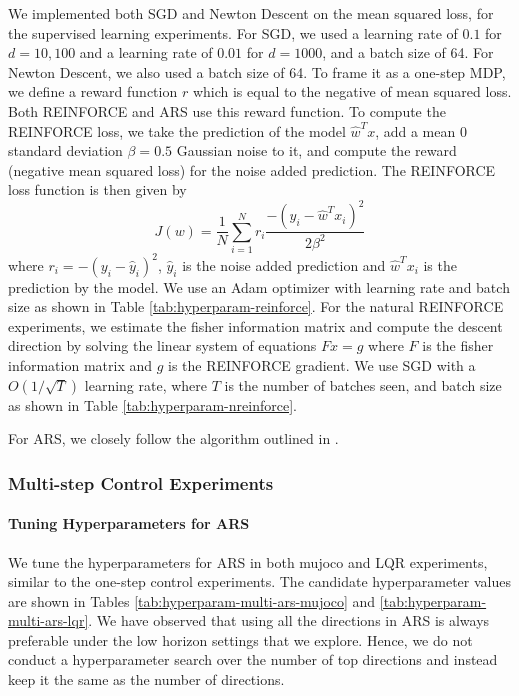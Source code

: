 We implemented both SGD and Newton Descent on the mean squared loss, for the supervised learning experiments. For SGD, we used a learning rate of $0.1$ for $d=10, 100$ and a learning rate of $0.01$ for $d=1000$, and a batch size of 64. For Newton Descent, we also used a batch size of 64. To frame it as a one-step MDP, we define a reward function $r$ which is equal to the negative of mean squared loss. Both REINFORCE and ARS use this reward function. To compute the REINFORCE loss, we take the prediction of the model $\hat{w}^Tx$, add a mean $0$ standard deviation $\beta = 0.5$ Gaussian noise to it, and compute the reward (negative mean squared loss) for the noise added prediction. The REINFORCE loss function is then given by
\begin{equation}
    J(w) = \frac{1}{N} \sum_{i=1}^N r_i \frac{- (y_i - \hat{w}^Tx_i)^2}{2\beta^2}
\end{equation}
where $r_i = -(y_i - \hat y_i)^2$, $\hat y_i$ is the noise added prediction and $\hat{w}^Tx_i$ is the prediction by the model. We use an Adam optimizer with learning rate and batch size as shown in Table \ref{tab:hyperparam-reinforce}. For the natural REINFORCE experiments, we estimate the fisher information matrix and compute the descent direction by solving the linear system of equations $Fx = g$ where $F$ is the fisher information matrix and $g$ is the REINFORCE gradient. We use SGD with a $O(1/\sqrt{T})$ learning rate, where $T$ is the number of batches seen, and batch size as shown in Table \ref{tab:hyperparam-nreinforce}.

For ARS, we closely follow the algorithm outlined in \citep{mania2018simple}.

\subsubsection{Multi-step Control Experiments}
\label{sec:multi-step-control-1}

\paragraph{Tuning Hyperparameters for ARS}
\label{sec:tuning-hyperp-ars}

We tune the hyperparameters for ARS \citep{mania2018simple} in both
mujoco and LQR experiments, similar to the one-step control
experiments. The candidate hyperparameter values are shown in Tables
\ref{tab:hyperparam-multi-ars-mujoco} and \ref{tab:hyperparam-multi-ars-lqr}. We have observed that using all the
directions in ARS is always preferable under the low horizon settings
that we explore. Hence, we do not conduct a hyperparameter search over
the number of top directions and instead keep it the same as the
number of directions.

